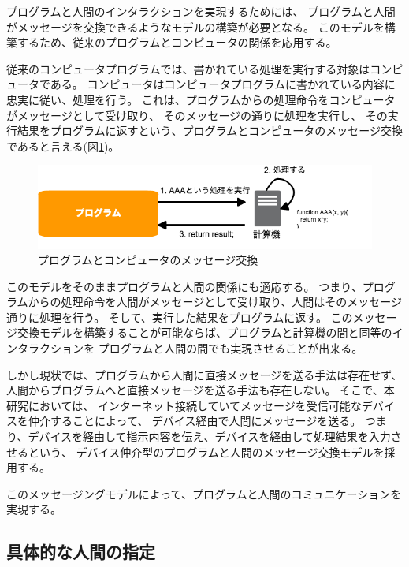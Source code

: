 プログラムと人間のインタラクションを実現するためには、
プログラムと人間がメッセージを交換できるようなモデルの構築が必要となる。
このモデルを構築するため、従来のプログラムとコンピュータの関係を応用する。

従来のコンピュータプログラムでは、書かれている処理を実行する対象はコンピュータである。
コンピュータはコンピュータプログラムに書かれている内容に忠実に従い、処理を行う。
これは、プログラムからの処理命令をコンピュータがメッセージとして受け取り、
そのメッセージの通りに処理を実行し、
その実行結果をプログラムに返すという、プログラムとコンピュータのメッセージ交換であると言える(図\ref{fig:program-machine-model})。

\begin{figure}[htbp]
  \begin{center}
  \includegraphics[width=.7\linewidth,bb=0 0 659 165]{images/program-machine-model.png}
  \end{center}
  \caption{プログラムとコンピュータのメッセージ交換}
  \label{fig:program-machine-model}
\end{figure}

このモデルをそのままプログラムと人間の関係にも適応する。
つまり、プログラムからの処理命令を人間がメッセージとして受け取り、人間はそのメッセージ通りに処理を行う。
そして、実行した結果をプログラムに返す。
このメッセージ交換モデルを構築することが可能ならば、プログラムと計算機の間と同等のインタラクションを
プログラムと人間の間でも実現させることが出来る。

しかし現状では、プログラムから人間に直接メッセージを送る手法は存在せず、
人間からプログラムへと直接メッセージを送る手法も存在しない。
そこで、本研究においては、
インターネット接続していてメッセージを受信可能なデバイスを仲介することによって、
デバイス経由で人間にメッセージを送る。
つまり、デバイスを経由して指示内容を伝え、デバイスを経由して処理結果を入力させるという、
デバイス仲介型のプログラムと人間のメッセージ交換モデルを採用する。

このメッセージングモデルによって、プログラムと人間のコミュニケーションを実現する。

\subsection{具体的な人間の指定}\label{ux5177ux4f53ux7684ux306aux4ebaux9593ux306eux6307ux5b9a}

